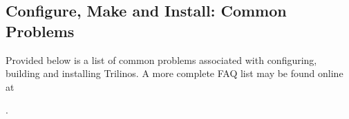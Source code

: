 \subsection{Configure, Make and Install: Common Problems}

\begin{minipage}[c]{\textwidth}

\begin{minipage}[l]{.6\textwidth}
Provided below is a list of common problems associated with configuring,
building and installing Trilinos.  A more complete FAQ list may be found online at
\end{minipage}\hfill
{}
\end{minipage}

.

